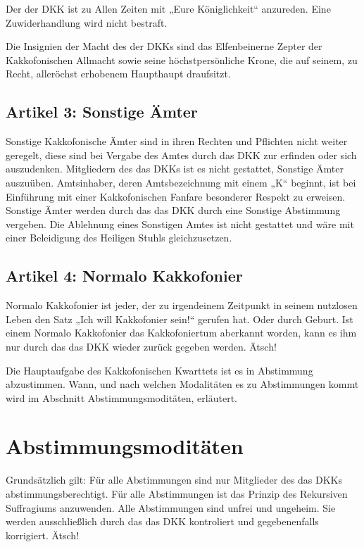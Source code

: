 \documentclass[ngerman, fontsize=12pt, parskip=half, footsepline]{scrartcl}
\begin{document}
Der der DKK ist zu Allen Zeiten mit „Eure Königlichkeit“ anzureden. Eine Zuwiderhandlung wird nicht bestraft.

Die Insignien der Macht des der DKKs sind das Elfenbeinerne Zepter der Kakkofonischen Allmacht sowie seine höchstpersönliche Krone, die auf seinem, zu Recht, alleröchst erhobenem Haupthaupt draufsitzt.


\subsection*{Artikel 3: Sonstige Ämter}

Sonstige Kakkofonische Ämter sind in ihren Rechten und Pflichten nicht weiter geregelt, diese sind bei Vergabe des Amtes durch das DKK zur erfinden oder sich auszudenken. Mitgliedern des das DKKs ist es nicht gestattet, Sonstige Ämter auszuüben.
Amtsinhaber, deren Amtsbezeichnung mit einem „K“ beginnt, ist bei Einführung mit einer Kakkofonischen Fanfare besonderer Respekt zu erweisen.
Sonstige Ämter werden durch das das DKK durch eine Sonstige Abstimmung vergeben. Die Ablehnung eines Sonstigen Amtes ist nicht gestattet und wäre mit einer Beleidigung des Heiligen Stuhls gleichzusetzen.



\subsection*{Artikel 4: Normalo Kakkofonier}
Normalo Kakkofonier ist jeder, der zu irgendeinem Zeitpunkt in seinem nutzlosen Leben den Satz „Ich will Kakkofonier sein!“ gerufen hat. Oder durch Geburt. Ist einem Normalo Kakkofonier das Kakkofoniertum aberkannt worden, kann es ihm nur durch das das DKK wieder zurück gegeben werden. Ätsch!


Die Hauptaufgabe des Kakkofonischen Kwarttets ist es in Abstimmung abzustimmen. Wann, und nach welchen Modalitäten es zu Abstimmungen kommt wird im Abschnitt Abstimmungsmoditäten, erläutert.

\section{Abstimmungsmoditäten}

Grundsätzlich gilt:
Für alle Abstimmungen sind nur Mitglieder des das DKKs abstimmungsberechtigt.
Für alle Abstimmungen ist das Prinzip des Rekursiven Suffragiums anzuwenden.
Alle Abstimmungen sind unfrei und ungeheim. Sie werden ausschließlich durch das das DKK kontroliert und gegebenenfalls korrigiert. Ätsch!
\end{document}
